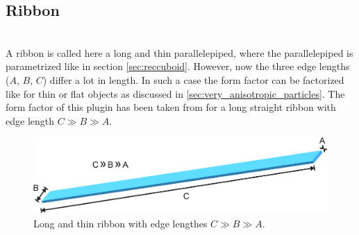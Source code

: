 \subsection{Ribbon} ~\\
\label{sec:ribbon}
A ribbon is called here a long and thin parallelepiped, where the parallelepiped is parametrized like in section \ref{sec:reccuboid}. However, now  the three edge lengths ($A$, $B$, $C$) differ a lot in length. In such a case the form factor can be factorized like for thin or flat objects as discussed in \ref{sec:very_anisotropic_particles}. The form factor of this plugin has been taken from \cite{Su2014} for a long straight ribbon with edge length $C \gg B \gg A$.
\begin{figure}[htb]
\begin{center}
\includegraphics[width=\textwidth]{../images/form_factor/anisotropic/ribbon.pdf}
\end{center}
\caption{Long and thin ribbon with edge lengthes $C \gg B \gg A$.}
\label{fig:ribbon}
\end{figure}

